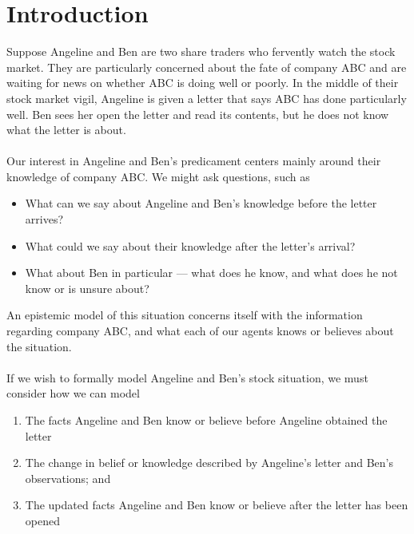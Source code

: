 \chapter{Introduction} \label{chapter:intro}

Suppose Angeline and Ben are two share traders who fervently watch the stock market. They
are particularly concerned about the fate of company ABC and are waiting for news on whether ABC is
doing well or poorly. In the middle of their stock market vigil, Angeline is given a letter that says
ABC has done particularly well. Ben sees her open the letter and read its contents, but he does not
know what the letter is about.\\
\\
Our interest in Angeline and Ben's predicament centers mainly around their knowledge of company ABC.
We might ask questions, such as
\begin{itemize}
	\item What can we say about Angeline and Ben's knowledge before the letter arrives?
	\item What could we say about their knowledge after the letter's arrival?
	\item What about Ben in particular --- what does he know, and what does he not know or is unsure about?
\end{itemize}
An epistemic model of this situation concerns itself with the information regarding company ABC, and
what each of our agents knows or believes about the situation.\\
\\
If we wish to formally model Angeline and Ben's stock situation, we must consider how we can model
\begin{enumerate}
	\item The facts Angeline and Ben know or believe before Angeline obtained the letter
	\item The change in belief or knowledge described by Angeline's letter and Ben's observations; and
	\item The updated facts Angeline and Ben know or believe after the letter has been opened
\end{enumerate}

